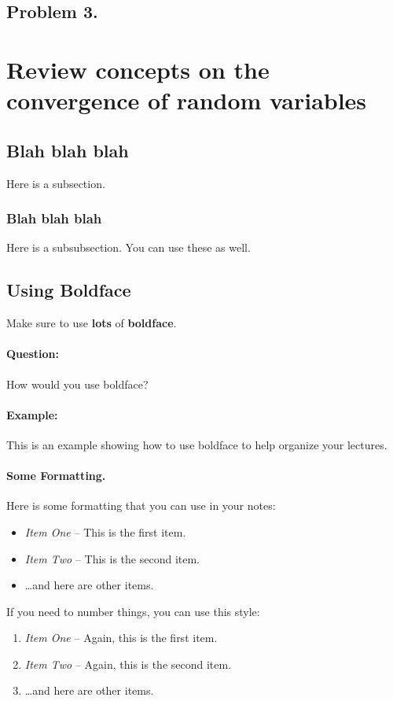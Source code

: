 \documentclass[11pt]{article}
\begin{document}
\subsection{Problem 3.}


\section{Review concepts on the convergence of random variables}

\subsection{Blah blah blah}
Here is a subsection.

\subsubsection{Blah blah blah}
Here is a subsubsection. You can use these as well.

\subsection{Using Boldface}
Make sure to use \textbf{lots} of {\bf boldface}.

\paragraph{Question:}
How would you use boldface?

\paragraph{Example:}
This is an example showing how to use boldface to 
help organize your lectures.


\paragraph{Some Formatting.}
Here is some formatting that you can use in your notes:
\begin{itemize}
\item {\em Item One} -- This is the first item.
\item {\em Item Two} -- This is the second item.
\item \dots and here are other items.
\end{itemize}

If you need to number things, you can use this style:
\begin{enumerate}
\item {\em Item One} -- Again, this is the first item.
\item {\em Item Two} -- Again, this is the second item.
\item \dots and here are other items.
\end{enumerate}
\end{document}
